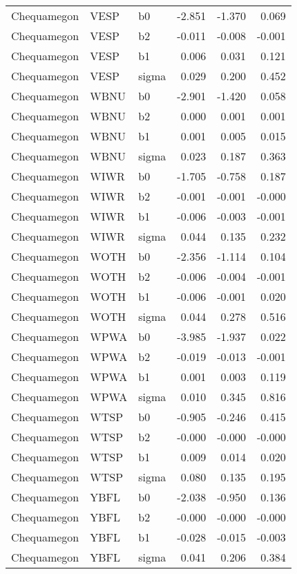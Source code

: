 \begin{table}[ht]
\begin{center}
\begin{tabular}{lllrrr}
  Chequamegon & VESP & b0 & -2.851 & -1.370 & 0.069 \\ 
  Chequamegon & VESP & b2 & -0.011 & -0.008 & -0.001 \\ 
  Chequamegon & VESP & b1 & 0.006 & 0.031 & 0.121 \\ 
  Chequamegon & VESP & sigma & 0.029 & 0.200 & 0.452 \\ 
  Chequamegon & WBNU & b0 & -2.901 & -1.420 & 0.058 \\ 
  Chequamegon & WBNU & b2 & 0.000 & 0.001 & 0.001 \\ 
  Chequamegon & WBNU & b1 & 0.001 & 0.005 & 0.015 \\ 
  Chequamegon & WBNU & sigma & 0.023 & 0.187 & 0.363 \\ 
  Chequamegon & WIWR & b0 & -1.705 & -0.758 & 0.187 \\ 
  Chequamegon & WIWR & b2 & -0.001 & -0.001 & -0.000 \\ 
  Chequamegon & WIWR & b1 & -0.006 & -0.003 & -0.001 \\ 
  Chequamegon & WIWR & sigma & 0.044 & 0.135 & 0.232 \\ 
  Chequamegon & WOTH & b0 & -2.356 & -1.114 & 0.104 \\ 
  Chequamegon & WOTH & b2 & -0.006 & -0.004 & -0.001 \\ 
  Chequamegon & WOTH & b1 & -0.006 & -0.001 & 0.020 \\ 
  Chequamegon & WOTH & sigma & 0.044 & 0.278 & 0.516 \\ 
  Chequamegon & WPWA & b0 & -3.985 & -1.937 & 0.022 \\ 
  Chequamegon & WPWA & b2 & -0.019 & -0.013 & -0.001 \\ 
  Chequamegon & WPWA & b1 & 0.001 & 0.003 & 0.119 \\ 
  Chequamegon & WPWA & sigma & 0.010 & 0.345 & 0.816 \\ 
  Chequamegon & WTSP & b0 & -0.905 & -0.246 & 0.415 \\ 
  Chequamegon & WTSP & b2 & -0.000 & -0.000 & -0.000 \\ 
  Chequamegon & WTSP & b1 & 0.009 & 0.014 & 0.020 \\ 
  Chequamegon & WTSP & sigma & 0.080 & 0.135 & 0.195 \\ 
  Chequamegon & YBFL & b0 & -2.038 & -0.950 & 0.136 \\ 
  Chequamegon & YBFL & b2 & -0.000 & -0.000 & -0.000 \\ 
  Chequamegon & YBFL & b1 & -0.028 & -0.015 & -0.003 \\ 
  Chequamegon & YBFL & sigma & 0.041 & 0.206 & 0.384 \\ 

\end{tabular}
\end{center}
\end{table}
